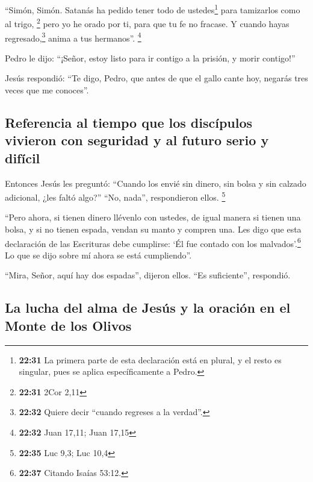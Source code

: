  ``Simón, Simón. Satanás ha pedido tener todo de
ustedes\footnote{\textbf{22:31} La primera parte de esta declaración
  está en plural, y el resto es singular, pues se aplica específicamente
  a Pedro.} para tamizarlos como al trigo, \footnote{\textbf{22:31} 2Cor
  2,11}  pero yo he orado por ti, para que tu fe no
fracase. Y cuando hayas regresado,\footnote{\textbf{22:32} Quiere decir
  ``cuando regreses a la verdad''.} anima a tus hermanos''. \footnote{\textbf{22:32}
  Juan 17,11; Juan 17,15}

 Pedro le dijo: ``¡Señor, estoy listo para ir contigo a
la prisión, y morir contigo!''

 Jesús respondió: ``Te digo, Pedro, que antes de que el
gallo cante hoy, negarás tres veces que me conoces''.

\hypertarget{referencia-al-tiempo-que-los-discuxedpulos-vivieron-con-seguridad-y-al-futuro-serio-y-difuxedcil}{%
\subsection{Referencia al tiempo que los discípulos vivieron con
seguridad y al futuro serio y
difícil}\label{referencia-al-tiempo-que-los-discuxedpulos-vivieron-con-seguridad-y-al-futuro-serio-y-difuxedcil}}

 Entonces Jesús les preguntó: ``Cuando los envié sin
dinero, sin bolsa y sin calzado adicional, ¿les faltó algo?'' ``No,
nada'', respondieron ellos. \footnote{\textbf{22:35} Luc 9,3; Luc 10,4}

 ``Pero ahora, si tienen dinero llévenlo con ustedes, de
igual manera si tienen una bolsa, y si no tienen espada, vendan su manto
y compren una.  Les digo que esta declaración de las
Escrituras debe cumplirse: `Él fue contado con los malvados'.\footnote{\textbf{22:37}
  Citando Isaías 53:12.} Lo que se dijo sobre mí ahora se está
cumpliendo''.

 ``Mira, Señor, aquí hay dos espadas'', dijeron ellos.
``Es suficiente'', respondió.

\hypertarget{la-lucha-del-alma-de-jesuxfas-y-la-oraciuxf3n-en-el-monte-de-los-olivos}{%
\subsection{La lucha del alma de Jesús y la oración en el Monte de los
Olivos}\label{la-lucha-del-alma-de-jesuxfas-y-la-oraciuxf3n-en-el-monte-de-los-olivos}}

